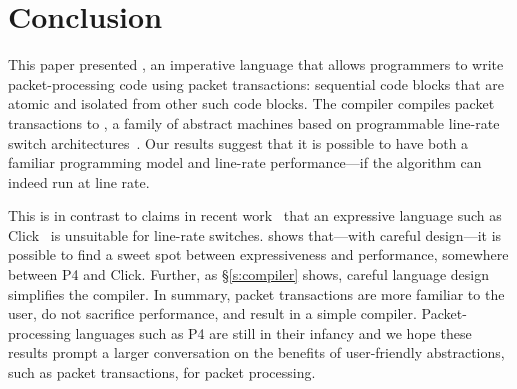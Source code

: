 \section{Conclusion}
\label{s:conclusion}

This paper presented \pktlanguage, an imperative language that allows
programmers to write packet-processing code using packet transactions:
sequential code blocks that are atomic and isolated from other such code
blocks. The \pktlanguage compiler compiles packet transactions to \absmachine,
a family of abstract machines based on programmable line-rate switch
architectures~\cite{flexpipe, xpliant, rmt}. Our results suggest that it is
possible to have both a familiar programming model and line-rate
performance---if the algorithm can indeed run at line rate.

This is in contrast to claims in recent work~\cite{p4} that an expressive
language such as Click~\cite{click} is unsuitable for line-rate switches.
\pktlanguage shows that---with careful design---it is possible to find a sweet
spot between expressiveness and performance, somewhere between P4 and Click.
Further, as \S\ref{s:compiler} shows, careful language design simplifies the
compiler.  In summary, packet transactions are more familiar to the user, do
not sacrifice performance, and result in a simple compiler.  Packet-processing
languages such as P4 are still in their infancy and we hope these results
prompt a larger conversation on the benefits of user-friendly abstractions,
such as packet transactions, for packet processing.
